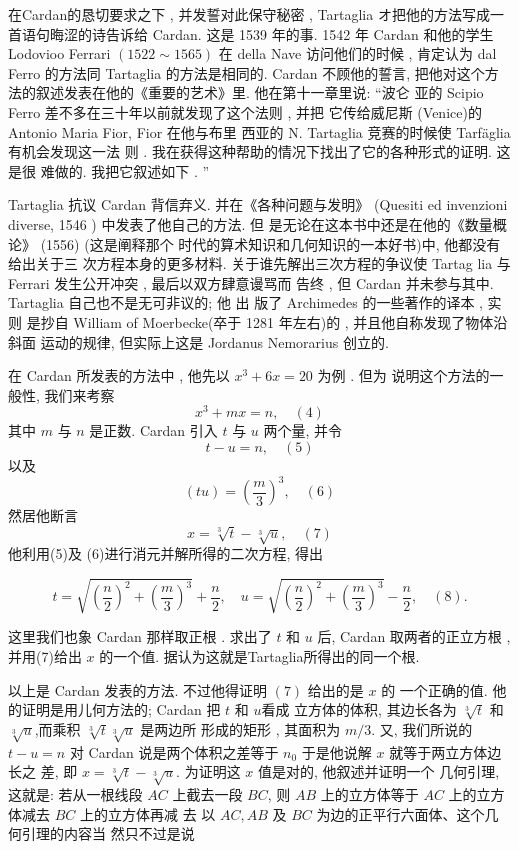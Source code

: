在Cardan的恳切要求之下 , 并发誓对此保守秘密 , Tartaglia
オ把他的方法写成一首语句晦涩的诗告诉给 Cardan. 这是 1539
年的事. 1542 年 Cardan 和他的学生Lodovioo Ferrari $(1522 \sim 1565)$
在 della Nave 访问他们的时候 , 肯定认为 dal Ferro 的方法同
Tartaglia 的方法是相同的. Cardan 不顾他的誓言, 把他对这个方
法的叙述发表在他的《重要的艺术》里. 他在第十一章里说: “波仑
亚的 Scipio Ferro 差不多在三十年以前就发现了这个法则 , 并把
它传给威尼斯 (Venice)的 Antonio Maria Fior, Fior 在他与布里
西亚的 N. Tartaglia 竞赛的时候使 Tarfäglia 有机会发现这一法
则 . 我在获得这种帮助的情况下找出了它的各种形式的证明. 这是很
难做的. 我把它叙述如下 . ”

Tartaglia 抗议 Cardan 背信弃义. 并在《各种问题与发明》
(Quesiti ed invenzioni diverse, 1546 ) 中发表了他自己的方法. 但
是无论在这本书中还是在他的《数量概论》 (1556) (这是阐释那个
时代的算术知识和几何知识的一本好书)中, 他都没有给出关于三
次方程本身的更多材料. 关于谁先解出三次方程的争议使 Tartag
lia 与 Ferrari 发生公开冲突 , 最后以双方肆意谩骂而 告终 , 但
Cardan 并未参与其中. Tartaglia 自己也不是无可非议的; 他 出
版了 Archimedes 的一些著作的译本 , 实则 是抄自 William of
Moerbecke(卒于 1281 年左右)的 , 并且他自称发现了物体沿斜面 
运动的规律, 但实际上这是 Jordanus Nemorarius 创立的.


在 Cardan 所发表的方法中 , 他先以 $x^{3}+6 x=20$ 为例 . 但为
说明这个方法的一般性, 我们来考察
\[
x^{3}+m x=n, \quad (4)
\]
其中 $m$ 与 $n$ 是正数. Cardan 引入 $t$ 与 $u$ 两个量, 并令
\[
t-u=n, \quad (5)
\]
以及
\[
(t u)=\left(\frac{m}{3}\right)^{3}, \quad (6)
\]
然居他断言
\[
x=\sqrt[3]{t}-\sqrt[3]{u}, \quad (7)
\]
他利用(5)及 (6)进行消元并解所得的二次方程, 得出

\[t=\sqrt{\left(\frac{n}{2}\right)^{2}+\left(\frac{m}{3}\right)^{3}}+\frac{n}{2}, \quad u=\sqrt{\left(\frac{n}{2}\right)^{2}+\left(\frac{m}{3}\right)^{3}}-\frac{n}{2}, \quad (8).\]

这里我们也象 Cardan 那样取正根 . 求出了 $t$ 和 $u$ 后, Cardan
取两者的正立方根 , 并用(7)给出 $x$ 的一个值. 据认为这就是Tartaglia所得出的同一个根.

以上是 Cardan 发表的方法. 不过他得证明 $(7)$ 给出的是 $x$ 的 
一个正确的值. 他的证明是用儿何方法的; Cardan 把 $t$ 和 $u$看成 
立方体的体积, 其边长各为 $\sqrt[3]{t}$ 和 $\sqrt[3]{u}$,而乘积 $\sqrt[3]{t} \sqrt[3]{u}$ 是两边所 
形成的矩形 , 其面积为 $m / 3 .$ 又, 我们所说的 $t-u=n$ 对 Cardan
说是两个体积之差等于 $n_{0}$ 于是他说解 $x$ 就等于两立方体边长之 
差, 即 $x=\sqrt[3]{t}-\sqrt[3]{u}$. 为证明这 $x$ 值是对的, 他叙述并证明一个 
几何引理, 这就是: 若从一根线段 $A C$ 上截去一段 $B C$, 则 $A B$ 上的立方体等于 $A C$ 上的立方体减去 $B C$ 上的立方体再减 去
以 $A C, A B$ 及 $B C$ 为边的正平行六面体、这个几何引理的内容当 
然只不过是说

